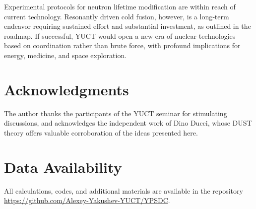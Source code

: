 \documentclass[12pt]{article}
\theoremstyle{remark}
\begin{document}
	Experimental protocols for neutron lifetime modification are within reach of current technology. Resonantly driven cold fusion, however, is a long‑term endeavor requiring sustained effort and substantial investment, as outlined in the roadmap. If successful, YUCT would open a new era of nuclear technologies based on coordination rather than brute force, with profound implications for energy, medicine, and space exploration.
	
	\section*{Acknowledgments}
	The author thanks the participants of the YUCT seminar for stimulating discussions, and acknowledges the independent work of Dino Ducci, whose DUST theory offers valuable corroboration of the ideas presented here.
	
	\section*{Data Availability}
	All calculations, codes, and additional materials are available in the repository \url{https://github.com/Alexey-Yakushev-YUCT/YPSDC}.
	
\end{document}
